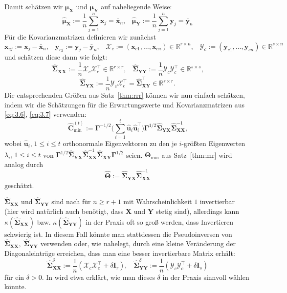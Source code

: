 \documentclass[]{article}
\newcommand{\R}{\mathbb{R}}
\newcommand{\X}{\mathbf{X}}
\newcommand{\Y}{\mathbf{Y}}
\newcommand{\T}{\mathbf{\Theta}}
\newcommand{\muu}{\bm{\mu}}
\newcommand{\Ssigma}{\mathbf{\Sigma}}
\newcommand{\uu}{\mathbf{u}}
\newcommand{\C}{\mathbf{C}}
\newcommand{\Ggamma}{\mathbf{\Gamma}}
\newcommand{\xx}{\mathbf{x}}
\newcommand{\yy}{\mathbf{y}}
\newcommand{\XX}{\mathcal{X}}
\newcommand{\YY}{\mathcal{Y}}
\begin{document}
Damit schätzen wir $\muu_\X$ und $\muu_\Y$ auf naheliegende Weise:
\[\widehat{\muu}_{\X} := \frac{1}{n} \sum_{j=1}^{n} \mathbf{x}_j = \bar{\xx}_n \text{,} \quad \widehat{\muu}_{\Y} := \frac{1}{n} \sum_{j=1}^{n} \mathbf{y}_j = \bar{\yy}_n \label{eq:3.6} \tag{3.6}\]
Für die Kovarianzmatrizen definieren wir zunächst
$$\xx_{cj} := \xx_j - \bar{\xx}_n \text{,} \quad \yy_{cj} := \yy_j - \bar{\yy}_n \text{,} \quad \XX_c := (\xx_{c1},\dots,\xx_{cn}) \in \R^{r \times n} \text{,} \quad \YY_c := (\yy_{c1},\dots,\yy_{cn}) \in \R^{s \times n}$$
und schätzen diese dann wie folgt:
$$ \widehat{\Ssigma}_{\X\X} := \frac{1}{n} \XX_c \XX_c^\top \in \R^{r \times r} \text{,} \quad \widehat{\Ssigma}_{\Y\Y} := \frac{1}{n} \YY_c \YY_c^\top \in \R^{s \times s} \text{,}$$
\[\widehat{\Ssigma}_{\Y\X} := \frac{1}{n} \YY_c \XX_c^\top = \widehat{\Ssigma}_{\X\Y}^\top \in \R^{s \times r} \text{.}\label{eq:3.7} \tag{3.7}\]
Die entsprechenden Größen aus Satz~\ref{thm:rrr} können wir nun einfach schätzen, indem wir die Schätzungen für die Erwartungswerte und Kovarianzmatrizen aus \eqref{eq:3.6}, \eqref{eq:3.7} verwenden:
$$\widehat{\C}^{(t)}_{\min} := \Ggamma^{-1/2} \biggl( \sum_{i=1}^{t} \widehat{\uu}_i \widehat{\uu}_i^\top \biggr) \Ggamma^{1/2} \widehat{\Ssigma}_{\Y\X} \widehat{\Ssigma}_{\X\X}^{-1} \text{,}$$
wobei $\widehat{\uu}_i\text{,} \; 1 \leq i \leq t$ orthonormale Eigenvektoren zu den je $i$-größten Eigenwerten $\lambda_i \text{,} \; 1 \leq i \leq t$ von
$\Ggamma^{1/2} \widehat{\Ssigma}_{\Y\X} \widehat{\Ssigma}_{\X\X}^{-1} \widehat{\Ssigma}_{\X\Y} \Ggamma^{1/2}$ seien. $\T_{\min}$ aus Satz~\ref{thm:mr} wird analog durch
$$\widehat{\T} := \widehat{\Ssigma}_{\Y\X} \widehat{\Ssigma}_{\X\X}^{-1}$$
geschätzt.

$\widehat{\Ssigma}_{\X\X}$ und $\widehat{\Ssigma}_{\Y\Y}$ sind nach \cite{EP73} für $n \geq r+1$ mit Wahrscheinlichkeit $1$ invertierbar (hier wird natürlich auch benötigt, dass $\X$ und $\Y$ stetig sind), allerdings kann $\kappa(\widehat{\Ssigma}_{\X\X})$ bzw. $\kappa(\widehat{\Ssigma}_{\Y\Y})$ in der Praxis oft so groß werden, dass Invertieren schwierig ist. In diesem Fall könnte man stattdessen die Pseudoinversen von $\widehat{\Ssigma}_{\X\X},\; \widehat{\Ssigma}_{\Y\Y}$ verwenden oder, wie \cite[Seite 182]{Iz08} nahelegt, durch eine kleine Veränderung der Diagonaleinträge erreichen, dass man eine besser invertierbare Matrix erhält:
$$\widehat{\Ssigma}_{\X\X}^{\delta} := \frac{1}{n}(\XX_c \XX_{c}^\top + \delta \mathbf{I}_r) \text{,}\quad \widehat{\Ssigma}_{\Y\Y}^{\delta} := \frac{1}{n}(\YY_c \YY_{c}^\top + \delta \mathbf{I}_s)$$
für ein $\delta > 0$. In \cite[Kapitel 6.3.4]{Iz08} wird etwa erklärt, wie man dieses $\delta$ in der Praxis sinnvoll wählen könnte.
\end{document}
